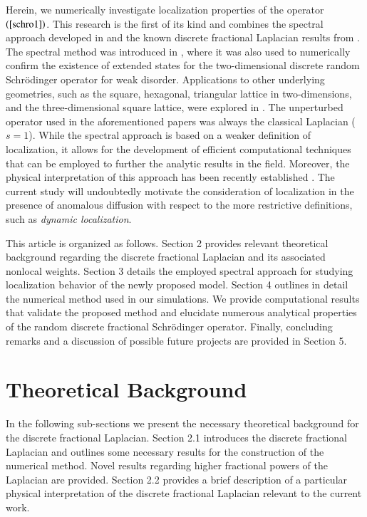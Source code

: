 \documentclass[final,1p,times]{elsarticle}
\def\R#1{$(\ref{#1})$}
\theoremstyle{remark}
\theoremstyle{definition}
\newcommand{\josh}[1]{\textcolor{red}{\textbf{#1}}}
\begin{document}
Herein, we numerically investigate localization properties of the operator \R{schro1}. This research is the first of its kind and combines the spectral approach developed in \cite{Liaw2013} and the known discrete fractional Laplacian results from \cite{ciaurri2015fractional}.
The spectral method was introduced in \cite{Liaw2013}, where it was also used to numerically confirm the existence of extended states for the two-dimensional discrete random Schr\"odinger operator for weak disorder. Applications to other underlying geometries, such as the square, hexagonal, triangular lattice in two-dimensions, and the three-dimensional square lattice, were explored in \cite{1751-8121-47-30-305202,2053-1591-3-12-125904,PhysRevB.96.235408,kostadinova2018transport,PhysRevB.99.024115}. The unperturbed operator used in the aforementioned papers was always the classical Laplacian ($s=1$). 
While the spectral approach is based on a weaker definition of localization, it allows for the development of efficient computational techniques that can be employed to further the analytic results in the field. Moreover, the physical interpretation of this approach has been recently established \cite{2053-1591-3-12-125904}. The current study will undoubtedly motivate the consideration of localization in the presence of anomalous diffusion with respect to the more restrictive definitions, such as {\em dynamic localization}.

This article is organized as follows. Section 2 provides relevant theoretical background regarding the discrete fractional Laplacian and its associated nonlocal weights. Section 3 details the employed spectral approach for studying localization behavior of the newly proposed model. Section 4 outlines in detail the numerical method used in our simulations. We provide computational results that validate the proposed method and elucidate numerous analytical properties of the random discrete fractional Schr{\"o}dinger operator. Finally, concluding remarks and a discussion of possible future projects are provided in Section 5. 

\section{Theoretical Background}

In the following sub-sections we present the necessary theoretical background for the discrete fractional Laplacian. Section 2.1 introduces the discrete fractional Laplacian and outlines some necessary results for the construction of the numerical method. Novel results regarding higher fractional powers of the Laplacian are provided. Section 2.2 provides a brief description of a particular physical interpretation of the discrete fractional Laplacian relevant to the current work. 
\end{document}
